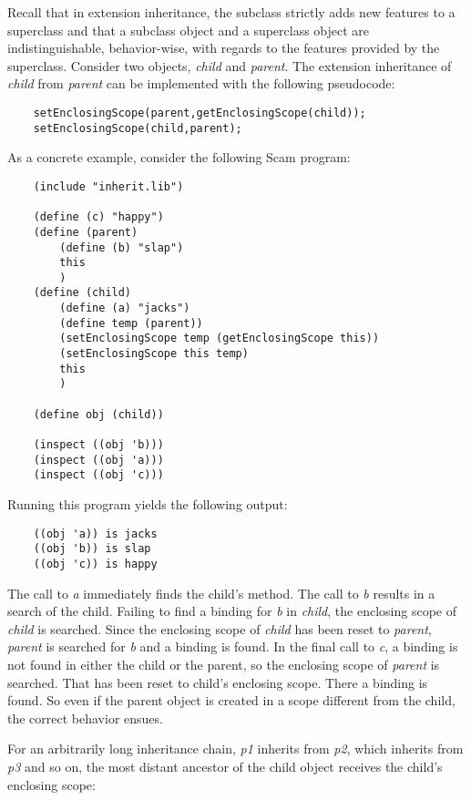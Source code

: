 {{Recall that in extension inheritance, the subclass strictly adds
new features to a superclass and that a subclass object and a
superclass object are indistinguishable, behavior-wise, with regards
to the features provided by the superclass.  
Consider two objects, {\it child} and {\it parent}. The extension
inheritance of {\it child} from {\it parent} can be implemented with
the following pseudocode:

\begin{verbatim}
    setEnclosingScope(parent,getEnclosingScope(child));
    setEnclosingScope(child,parent);
\end{verbatim}

As a concrete example, consider the following Scam program:

\begin{verbatim}
    (include "inherit.lib")

    (define (c) "happy")
    (define (parent)
        (define (b) "slap")
        this
        )
    (define (child)
        (define (a) "jacks")
        (define temp (parent))
        (setEnclosingScope temp (getEnclosingScope this))
        (setEnclosingScope this temp)
        this
        )

    (define obj (child))

    (inspect ((obj 'b)))
    (inspect ((obj 'a)))
    (inspect ((obj 'c)))
\end{verbatim}

Running this program yields the following output:

\begin{verbatim}
    ((obj 'a)) is jacks
    ((obj 'b)) is slap
    ((obj 'c)) is happy
\end{verbatim}

The call to {\it a} immediately finds the child's method.  The call to
{\it b} results in a search of the child. Failing to find a binding
for {\it b} in {\it child}, the enclosing scope of {\it child} is
searched. Since the enclosing scope of {\it child} has been reset to {\it
parent}, {\it parent} is searched for {\it b} and a binding is found.
In the final call to {\it c}, a binding is not found in either the
child or the parent, so the enclosing scope of {\it parent} is searched.
That has been reset to {\sc child}'s enclosing scope. There a binding
is found. So even if the parent object is created in a scope different
from the child, the correct behavior ensues.

For an arbitrarily long inheritance chain, {\it p1} inherits from {\it
p2}, which inherits from {\it p3} and so on, the most distant ancestor
of the child object receives the child's enclosing scope:

}}
